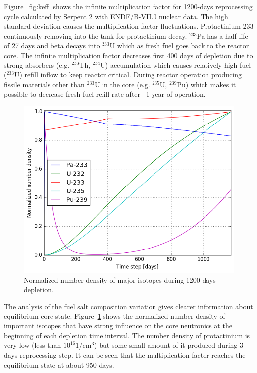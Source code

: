 \documentclass{anstrans}
\begin{document}
\FloatBarrier

Figure~\ref{fig:keff} shows the infinite multiplication factor for 1200-days
reprocessing cycle calculated by Serpent 2 with ENDF/B-VII.0 nuclear data. The 
high standard deviation causes the multiplication factor fluctuations. 
Protactinium-233 continuously removing into the tank for protactinium decay. 
$^{233}$Pa has a half-life of 27 days and beta decays into $^{233}$U which as 
fresh fuel goes back to the reactor core. The infinite multiplication factor 
decreases first 400 days of depletion due to strong absorbers (e.g. $^{233}$Th, 
$^{234}$U) accumulation which causes relatively high fuel ($^{233}$U) refill 
inflow to keep reactor critical. During reactor operation producing fissile 
materials other than $^{233}$U in the core (e.g. $^{235}$U, $^{239}$Pu) which 
makes it possible to decrease fresh fuel refill rate after ~1 year of 
operation.

\begin{figure}[htbp!] %
        \centering
        \includegraphics[width=1.03\linewidth]{fuel_composition.png}
        \caption{Normalized number density of major isotopes during 1200 days 
        depletion.}
        \label{fig:compos}
\end{figure}

\FloatBarrier

The analysis of the fuel salt composition variation gives clearer information 
about equilibrium core state. Figure~\ref{fig:compos} shows the normalized 
number density of important isotopes that have strong influence on the core 
neutronics at the beginning of each depletion time interval. The number density 
of protactinium is very low (less than $10^{16}$1/cm$^3$) but some small amount 
of it produced during 3-days reprocessing step. It can be seen that the 
multiplication factor reaches the equilibrium state at about 950  days. 
\end{document}
